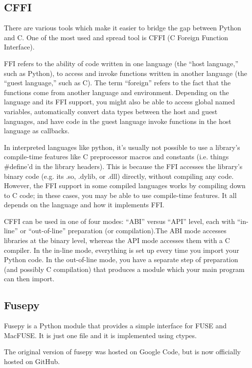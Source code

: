     \subsection{CFFI}
        There are various tools which make it easier to bridge the gap between Python and C. One of the most used and spread tool is CFFI (C Foreign Function Interface).

        FFI refers to the ability of code written in one language (the “host language,” such as Python), to access and invoke functions written in another language (the “guest language,” such as C). The term “foreign” refers to the fact that the functions come from another language and environment.
        Depending on the language and its FFI support, you might also be able to access global named variables, automatically convert data types between the host and guest languages, and have code in the guest language invoke functions in the host language as callbacks.

        In interpreted languages like python, it’s usually not possible to use a library’s compile-time features like C preprocessor macros and constants (i.e. things \#define’d in the library headers). This is because the FFI accesses the library’s binary code (e.g. its .so, .dylib, or .dll) directly, without compiling any code.
        However, the FFI support in some compiled languages works by compiling down to C code; in these cases, you may be able to use compile-time features. It all depends on the language and how it implements FFI.

        CFFI can be used in one of four modes: “ABI” versus “API” level, each with “in-line” or “out-of-line” preparation (or compilation).The ABI mode accesses libraries at the binary level, whereas the API mode accesses them with a C compiler.
        In the in-line mode, everything is set up every time you import your Python code. In the out-of-line mode, you have a separate step of preparation (and possibly C compilation) that produces a module which your main program can then import.
    \subsection{Fusepy}
        Fusepy is a Python module that provides a simple interface for FUSE and MacFUSE. It is just one file and it is implemented using ctypes.

        The original version of fusepy was hosted on Google Code, but is now officially hosted on GitHub.

